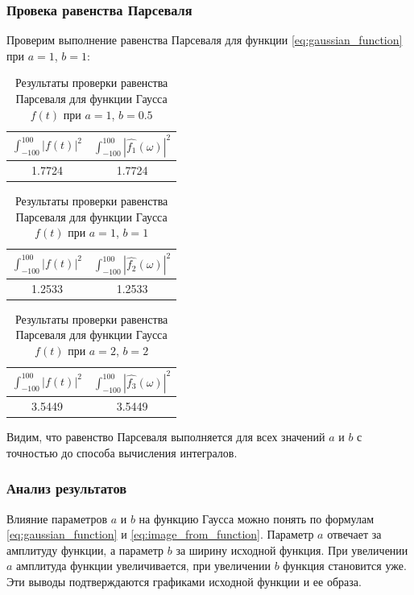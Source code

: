 \FloatBarrier
\subsubsection{Провека равенства Парсеваля}
Проверим выполнение равенства Парсеваля для функции \eqref{eq:gaussian_function} при $a = 1$, $b = 1$:
\begin{table}[ht!]
    \centering
    \begin{tabular}{|c|c|}
        \hline
        $\displaystyle\int_{-100}^{100}{|f(t)|^2}$ & $\displaystyle\int_{-100}^{100}{|\hat{f_1}(\omega)|^2}$ \\
        \hline
        1.7724 & 1.7724 \\
        \hline
    \end{tabular}
    \caption{Результаты проверки равенства Парсеваля для функции Гаусса $f(t)$ при $a = 1$, $b = 0.5$}
    \label{tab:gaussian_1_parseval_check}
\end{table}

\begin{table}
    \centering
    \begin{tabular}{|c|c|}
        \hline
        $\displaystyle\int_{-100}^{100}{|f(t)|^2}$ & $\displaystyle\int_{-100}^{100}{|\hat{f_2}(\omega)|^2}$ \\
        \hline
        1.2533 & 1.2533 \\
        \hline
    \end{tabular}
    \caption{Результаты проверки равенства Парсеваля для функции Гаусса $f(t)$ при $a = 1$, $b = 1$}
    \label{tab:gaussian_2_parseval_check}
\end{table}

\begin{table}
    \centering
    \begin{tabular}{|c|c|}
        \hline
        $\displaystyle\int_{-100}^{100}{|f(t)|^2}$ & $\displaystyle\int_{-100}^{100}{|\hat{f_3}(\omega)|^2}$ \\
        \hline
        3.5449 & 3.5449 \\
        \hline
    \end{tabular}
    \caption{Результаты проверки равенства Парсеваля для функции Гаусса $f(t)$ при $a = 2$, $b = 2$}
    \label{tab:gaussian_3_parseval_check}
\end{table}

Видим, что равенство Парсеваля выполняется для всех значений $a$ и $b$ с точностью до способа вычисления интегралов.

\subsubsection{Анализ результатов}
Влияние параметров $a$ и $b$ на функцию Гаусса можно понять по формулам \eqref{eq:gaussian_function} и \eqref{eq:image_from_function}. Параметр $a$ отвечает за амплитуду функции, а параметр $b$ за ширину исходной функция. При увеличении $a$ амплитуда функции увеличивается, при увеличении $b$ функция становится уже. 
Эти выводы подтверждаются графиками исходной функции и ее образа.